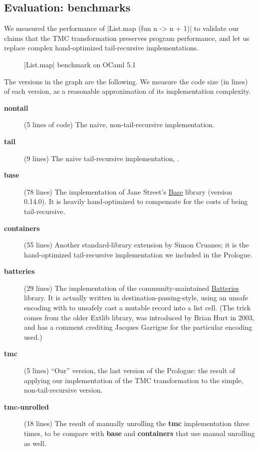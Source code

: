 \subsection{Evaluation: benchmarks}

We measured the performance of \ocaml|List.map (fun n -> n + 1)| to validate our claims that the TMC transformation preserves program performance, and let us replace complex hand-optimized tail-recursive implementations.

\begin{figure}[tp]
\def\svgscale{0.8}
\graphicspath{{plots/}}

\caption{\ocaml|List.map| benchmark on OCaml 5.1}
\label{fig:bench5}
\end{figure}

\newcommand{\bench}[1]{\textbf{#1}}

The  versions in the graph are the following. We measure the code size (in lines) of each version, as a reasonable approximation of its implementation complexity.
\begin{description}
\item[\bench{nontail}] (5 lines of code) The naive, non-tail-recursive implementation.
\item[\bench{tail}] (9 lines) The naive tail-recursive implementation,
  .
\item[\bench{base}] (78 lines) The implementation of Jane Street's
  \href{https://github.com/janestreet/base}{Base} library
  (version 0.14.0). It is heavily hand-optimized to compensate for the costs
  of being tail-recursive.
\item[\bench{containers}] (55 lines) Another standard-library extension by Simon
  Cruanes; it is the hand-optimized tail-recursive implementation we
  included in the Prologue.
\item[\bench{batteries}] (29 lines) The implementation of the community-maintained
  \href{https://github.com/ocaml-batteries-team/batteries-included/}{Batteries}
  library. It is actually written in destination-passing-style, using
  an unsafe encoding with  to unsafely cast a mutable
  record into a list cell. (The trick comes from the older Extlib
  library, was introduced by Brian Hurt in 2003, and has a comment crediting Jacques
  Garrigue for the particular encoding used.)
\item[\bench{tmc}] (5 lines) ``Our'' version, the last version of the Prologue: the
  result of applying our implementation of the TMC transformation to
  the simple, non-tail-recursive version.
\item[\bench{tmc-unrolled}] (18 lines) The result of manually unrolling the \bench{tmc} implementation three times, to be compare with \bench{base} and \bench{containers} that use manual unrolling as well.
\end{description}

